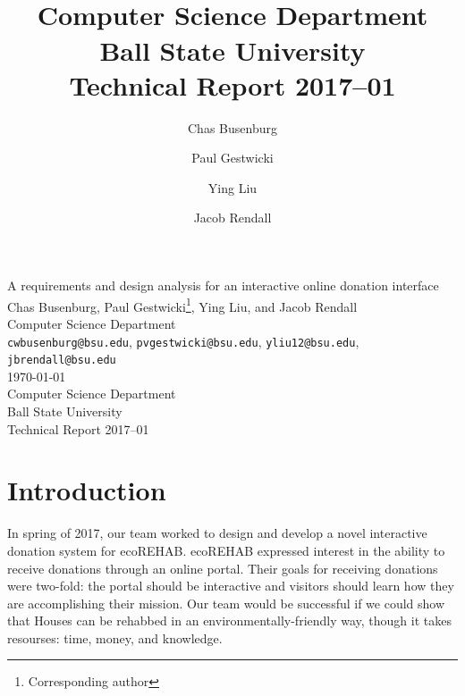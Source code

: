 \documentclass[letter]{article}
\title{\\
  Computer Science Department\\
  Ball State University\\
  Technical Report 2017--01}
\author{
  Chas Busenburg
  \and
  Paul Gestwicki
  \and
  Ying Liu
  \and
  Jacob Rendall}
\begin{document}
\begin{centering}
{\Large A requirements and design analysis for an interactive online donation interface}\\
\vspace{0.5cm}
Chas Busenburg, Paul Gestwicki\footnote{Corresponding author}, Ying Liu, and Jacob Rendall\\
Computer Science Department\\
\texttt{cwbusenburg@bsu.edu}, 
\texttt{pvgestwicki@bsu.edu},
\texttt{yliu12@bsu.edu},
\texttt{jbrendall@bsu.edu}\\
\vspace{0.5cm}
\today\\
\vspace{0.5cm}
Computer Science Department\\
Ball State University\\
Technical Report 2017--01\\
\end{centering}

\section*{Introduction}

In spring of 2017, our team worked to design and develop a novel interactive
donation system for ecoREHAB. ecoREHAB expressed interest in the ability
to receive donations through an online portal. Their goals for
receiving donations were two-fold: the portal should be interactive and visitors should
learn how they are accomplishing their mission. Our team would be successful if we could
show that Houses can be rehabbed in an environmentally-friendly way, though it takes resourses:
time, money, and knowledge.

\end{document}
